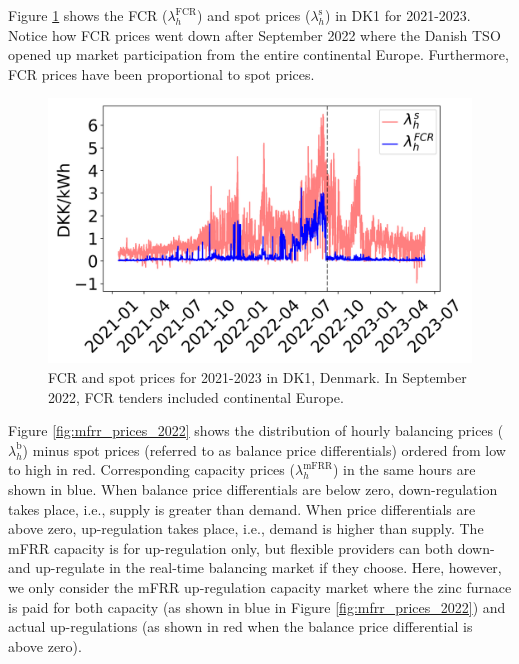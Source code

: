 \documentclass[sigconf]{acmart}
\begin{document}

Figure \ref{fig:fcr_prices_2022} shows the FCR ($\lambda_{h}^{\text{FCR}}$) and spot prices ($\lambda_{h}^{\text{s}}$) in DK1 for 2021-2023. Notice how FCR prices went down after September 2022 where the Danish TSO opened up market participation from the entire continental Europe. Furthermore, FCR prices have been proportional to spot prices.

\begin{figure}[t]
    \centering
    \includegraphics[width=\columnwidth]{figures/fcr_prices.png}
    \caption{FCR and spot prices for 2021-2023 in DK1, Denmark. In September 2022, FCR tenders included continental Europe.}
    \label{fig:fcr_prices_2022}
\end{figure}


Figure \ref{fig:mfrr_prices_2022} shows the distribution of hourly balancing prices ($\lambda_{h}^{\text{b}}$) minus spot prices (referred to as balance price differentials) ordered from low to high in red. Corresponding capacity prices ($\lambda_{h}^{\text{mFRR}}$) in the same hours are shown in blue. When balance price differentials are below zero, down-regulation takes place, i.e., supply is greater than demand. When price differentials are above zero, up-regulation takes place, i.e., demand is higher than supply. The mFRR capacity is for up-regulation only, but flexible providers can both down- and up-regulate in the real-time balancing market if they choose. Here, however, we only consider the mFRR up-regulation capacity market where the zinc furnace is paid for both capacity (as shown in blue in Figure \ref{fig:mfrr_prices_2022}) and actual up-regulations (as shown in red when the balance price differential is above zero).
\end{document}
